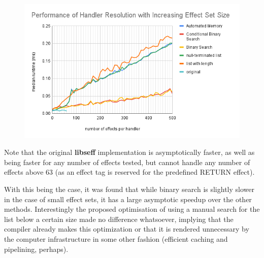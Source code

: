 \documentclass[logo,bsc,singlespacing,parskip,online]{infthesis}
\begin{document}
\begin{figure}[ht]
    \centering
    \includegraphics[width=\linewidth]{lines_new.png}
    \caption{}
    \label{fig:parametrized_actual}
\end{figure}

Note that the original \textbf{libseff} implementation is asymptotically faster, as well as being faster for any number of effects tested, but cannot handle any number of effects above 63 (as an effect tag is reserved for the predefined RETURN effect).

With this being the case, it was found that while binary search is slightly slower in the case of small effect sets, it has a large asymptotic speedup over the other methods. Interestingly the proposed optimisation of using a manual search for the list below a certain size made no difference whatsoever, implying that the compiler already makes this optimization or that it is rendered unnecessary by the computer infrastructure in some other fashion (efficient caching and pipelining, perhaps).
\end{document}
